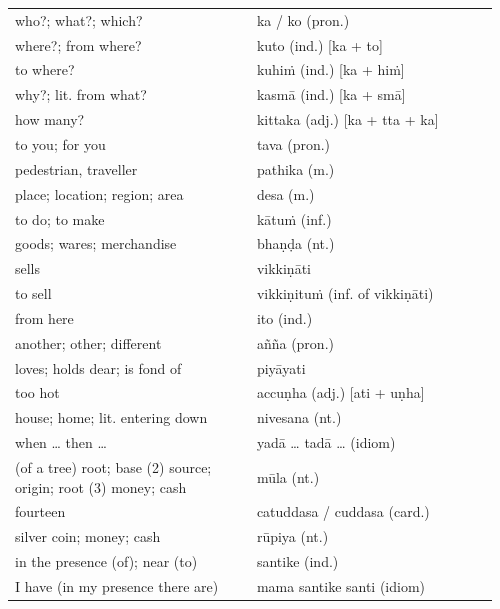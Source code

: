 \documentclass[11pt,oneside]{memoir}
\begin{document}
\begin{longtable}{L{0.48\linewidth} L{0.48\linewidth}}
who?; what?; which? & ka / ko (pron.)\\[0pt]
where?; from where? & kuto (ind.) [ka + to]\\[0pt]
to where? & kuhiṁ (ind.) [ka + hiṁ]\\[0pt]
why?; lit. from what? & kasmā (ind.) [ka + smā]\\[0pt]
how many? & kittaka (adj.) [ka + tta + ka]\\[0pt]
to you; for you & tava (pron.)\\[0pt]
pedestrian, traveller & pathika (m.)\\[0pt]
place; location; region; area & desa (m.)\\[0pt]
to do; to make & kātuṁ (inf.)\\[0pt]
goods; wares; merchandise & bhaṇḍa (nt.)\\[0pt]
sells & vikkiṇāti\\[0pt]
to sell & vikkiṇituṁ (inf. of vikkiṇāti)\\[0pt]
from here & ito (ind.)\\[0pt]
another; other; different & añña (pron.)\\[0pt]
loves; holds dear; is fond of & piyāyati\\[0pt]
too hot & accuṇha (adj.) [ati + uṇha]\\[0pt]
house; home; lit. entering down & nivesana (nt.)\\[0pt]
when \ldots{} then \ldots{} & yadā \ldots{} tadā \ldots{} (idiom)\\[0pt]
(of a tree) root; base (2) source; origin; root (3) money; cash & mūla (nt.)\\[0pt]
fourteen & catuddasa / cuddasa (card.)\\[0pt]
silver coin; money; cash & rūpiya (nt.)\\[0pt]
in the presence (of); near (to) & santike (ind.)\\[0pt]
I have (in my presence there are) & mama santike santi (idiom)\\[0pt]
\end{longtable}

\renewcommand{\arraystretch}{1.4}
\end{document}
